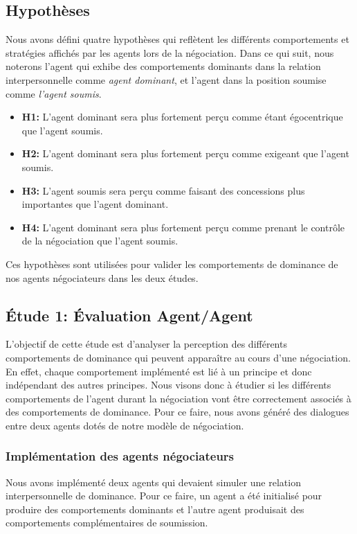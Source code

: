 		\subsection{Hypothèses}
				
				Nous avons défini quatre hypothèses qui reflètent les différents comportements et stratégies affichés par les agents lors de la négociation. Dans ce qui suit, nous noterons l'agent qui exhibe des comportements dominants dans la relation interpersonnelle comme \emph{agent dominant}, et l'agent dans la position soumise comme \emph{l'agent soumis}.
				
				\begin{itemize}
					\item \textbf {H1:} L'agent dominant sera plus fortement perçu comme étant égocentrique que l'agent soumis.
					
					\item \textbf {H2:} L'agent dominant sera plus fortement perçu comme exigeant que l'agent soumis.
					
					\item \textbf {H3:} L'agent soumis sera perçu comme faisant des concessions plus importantes que l'agent dominant.
					
					\item \textbf {H4:} L'agent dominant sera plus fortement perçu comme prenant le contrôle de la négociation que l'agent soumis.
					
				\end{itemize}
				
				Ces hypothèses sont utilisées pour valider les comportements de dominance de nos agents négociateurs dans les deux études. 
				
		\subsection{Étude 1: Évaluation Agent/Agent}
				L'objectif de cette étude est d'analyser la perception des différents comportements de dominance qui peuvent apparaître au cours d'une négociation. En effet, chaque comportement implémenté est lié à un principe et donc indépendant des autres principes. Nous visons donc à étudier si les différents comportements de l'agent durant la négociation vont être correctement associés à des comportements de dominance. Pour ce faire, nous avons généré des dialogues entre deux agents dotés de notre modèle de négociation. 
			
			\subsubsection{Implémentation des agents négociateurs}
				Nous avons implémenté deux agents qui devaient simuler une relation interpersonnelle de dominance. Pour ce faire, un agent a été initialisé pour produire des comportements dominants et l'autre agent produisait des comportements complémentaires de soumission. 
				
